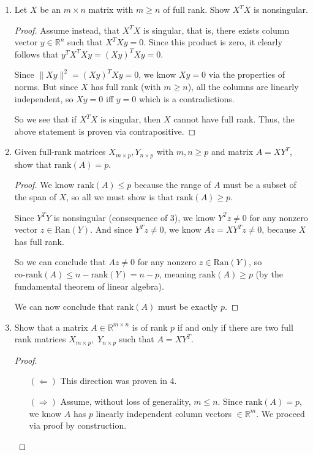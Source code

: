 \documentclass[11pt]{article}
\newcommand{\R}{\mathbb{R}}
\newcommand{\n}{\vspace{0.2cm}}
\begin{document}
\begin{enumerate}
	\item Let \(X\) be an \(m \times n\) matrix with \(m \geq n\) of full rank.  Show \(X^T X\) is nonsingular.
	      \begin{proof}
		      Assume instead, that \(X^TX\) is singular, that is, there exists column vector \(y \in \R^n\) such that \(X^TXy = 0\).  Since this product is zero, it clearly follows that \(y^TX^TXy = (Xy)^T Xy = 0\).

		      Since \(\lVert Xy \rVert^2 = (Xy)^TXy = 0\), we know \(Xy = 0\) via the properties of norms.  But since \(X\) has full rank (with \(m \geq n\)), all the columns are linearly independent, so \(Xy = 0\) iff \(y=0\) which is a contradictions.

		      So we see that if \(X^TX\) is singular, then \(X\) cannot have full rank.  Thus, the above statement is proven via contrapositive.
	      \end{proof}

	\item Given full-rank matrices \(X_{m \times p}, Y_{n \times p}\) with \(m,n \geq p\) and matrix \(A = XY^T\), show that \(\text{rank}(A) = p\).
	      \begin{proof}
		      We know \(\text{rank}(A) \leq p\) because the range of \(A\) must be a subset of the span of \(X\), so all we must show is that \(\text{rank}(A) \geq p\).

		      Since \(Y^TY\) is nonsingular (consequence of 3), we know \(Y^Tz \neq 0\) for any nonzero vector \(z \in \text{Ran}(Y)\).  And since \(Y^Tz \neq 0\), we know \(Az = XY^Tz \neq 0\), because \(X\) has full rank.

		      So we can conclude that \(Az \neq 0\) for any nonzero \(z \in \text{Ran}(Y)\), so \(\text{co-rank}(A) \leq n-\text{rank}(Y) = n-p\), meaning \(\text{rank}(A) \geq p\) (by the fundamental theorem of linear algebra).

		      We can now conclude that \(\text{rank}(A)\) must be exactly \(p\).
	      \end{proof}

	\item Show that a matrix \(A \in \R^{m \times n}\) is of rank \(p\) if and only if there are two full rank matrices \(X_{m \times p}, \; Y_{n \times p}\) such that \(A = XY^T\).
	      \begin{proof}
		      \begin{itemize}
			      \item[\((\Leftarrow)\)] This direction was proven in 4.
			      \item[\((\Rightarrow)\)] Assume, without loss of generality, \(m \leq n\).  Since \(\text{rank}(A) = p\), we know \(A\) has \(p\) linearly independent column vectors \(\in \R^m\).  We proceed via proof by construction. \n


\end{itemize}
\end{proof}
\end{enumerate}
\end{document}
